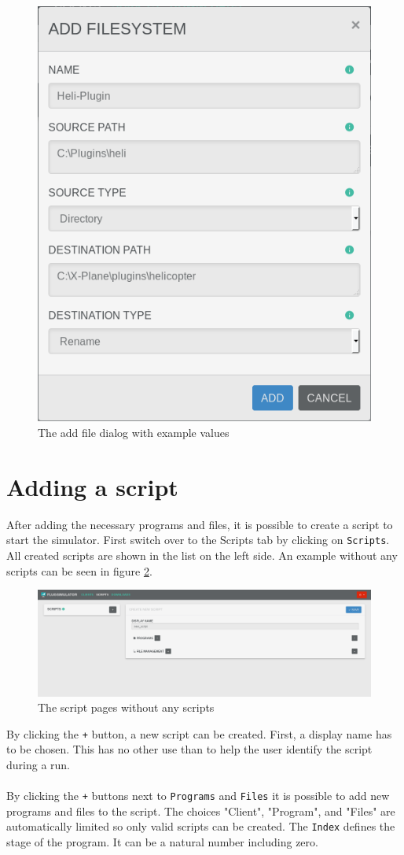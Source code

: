 \documentclass[accentcolor=tud1a, paper=a4, colorback]{tudreport}
\begin{document}
	\begin{figure}[h]
		\centering
		\includegraphics[width=.3\textwidth]{add_filesystem}
		\caption{The add file dialog with example values}
		\label{add_filesystem}
	\end{figure}

	\section{Adding a script}
	After adding the necessary programs and files, it is possible to create a script
	to start the simulator.
	First switch over to the Scripts tab by clicking on \texttt{Scripts}.
	All created scripts are shown in the list on the left side. An example
	without any scripts can be seen in figure \ref{scriptpage_without_scripts}.
	\begin{figure}[H]
		\centering
		\includegraphics[width=.9\textwidth]{scriptpage_without_scripts}
		\caption{The script pages without any scripts}
		\label{scriptpage_without_scripts}
	\end{figure}
	By clicking the \texttt{+} button, a new script can be created. First, a
	display name has to be chosen. This has no other use than to help
	the user identify the script during a run.
	\\\\
	By clicking the \texttt{+} buttons next to \texttt{Programs} and \texttt{Files} it is possible
	to add new programs and files to the script. The choices "Client", "Program", and "Files" are automatically
	limited so only valid scripts can be created. The \texttt{Index} defines the stage of the
	program. It can be a natural number including zero.
\end{document}
